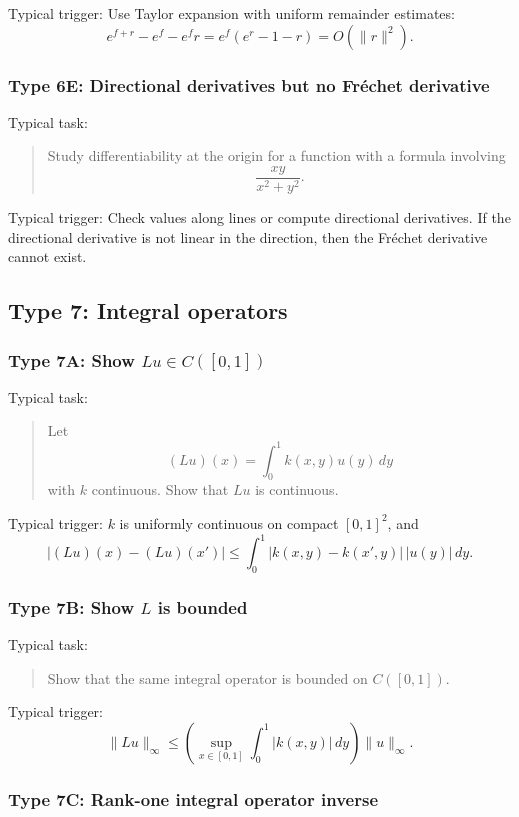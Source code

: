 Typical trigger: Use Taylor expansion with uniform remainder estimates:
\[
    e^{f+r}-e^f-e^f r
    =
    e^f(e^r-1-r)
    =
    O(\|r\|^2).
\]

\subsubsection*{Type 6E: Directional derivatives but no Fréchet derivative}

Typical task:
\begin{quote}
    Study differentiability at the origin for a function with a formula involving
    \[
        \frac{xy}{x^2+y^2}.
    \]
\end{quote}

Typical trigger: Check values along lines or compute directional derivatives. If the directional derivative is not linear in the direction, then the Fréchet derivative cannot exist.

\subsection{Type 7: Integral operators}

\subsubsection*{Type 7A: Show $Lu\in C([0,1])$}

Typical task:
\begin{quote}
    Let
    \[
        (Lu)(x)=\int_0^1 k(x,y)u(y)\,dy
    \]
    with $k$ continuous. Show that $Lu$ is continuous.
\end{quote}

Typical trigger: $k$ is uniformly continuous on compact $[0,1]^2$, and
\[
    |(Lu)(x)-(Lu)(x')|
    \leq
    \int_0^1 |k(x,y)-k(x',y)|\,|u(y)|\,dy.
\]

\subsubsection*{Type 7B: Show $L$ is bounded}

Typical task:
\begin{quote}
    Show that the same integral operator is bounded on $C([0,1])$.
\end{quote}

Typical trigger:
\[
    \|Lu\|_\infty
    \leq
    \left(\sup_{x\in[0,1]}\int_0^1 |k(x,y)|\,dy\right)
    \|u\|_\infty.
\]

\subsubsection*{Type 7C: Rank-one integral operator inverse}

